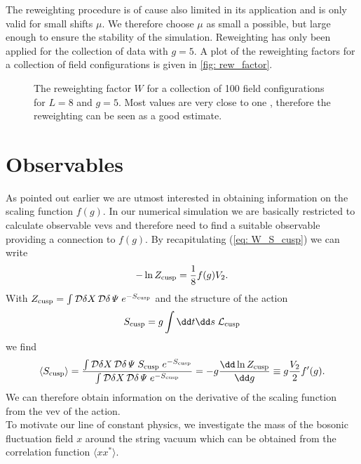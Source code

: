 %
%
The reweighting procedure is of cause also limited in its application and is only valid for small shifts $\mu$. We therefore choose $\mu$ as small a possible, but large enough to ensure the stability of the simulation. Reweighting has only been applied for the collection of data with $g=5$. A plot of the reweighting factors for a collection of field configurations is given in \autoref{fig: rew_factor}.
%
%
\begin{figure}
\centering

\caption{The reweighting factor $W$ for a collection of 100 field configurations for $L=8$ and $g=5$. Most values are very close to one , therefore the reweighting can be seen as a good estimate. \label{fig: rew_factor}}
\end{figure}
%
%
%
%
%
%
%
%
%
%
%
\section{Observables}
As pointed out earlier we are utmost interested in obtaining information on the scaling function $f(g)$. In our numerical simulation we are basically restricted to calculate observable vevs and therefore need to find a suitable observable providing a connection to $f(g)$. By recapitulating (\ref{eq: W_S_cusp}) we can write
%
%
\begin{equation}
-\ln Z_{\rm cusp} = \frac{1}{8} f(g)V_{2}.
\end{equation}
%
%
With $Z_{\rm cusp} = \int \mathcal{D}\delta X\,\mathcal{D}\delta \mathit{\Psi}\;e^{-S_{\rm cusp}}$ and the structure of the action 
\begin{equation}
S_{\rm cusp} = g \int \dd t \dd s \; \mathcal{L}_{\rm cusp}
\end{equation}
we find
%
%
\begin{equation}
\langle S_{\rm cusp} \rangle = \frac{\int \mathcal{D}\delta X\,\mathcal{D}\delta\mathit{\Psi} \; S_{\rm cusp} \;e^{-S_{\rm cusp}}}{\int \mathcal{D}\delta X\,\mathcal{D}\delta\mathit{\Psi} \; e^{-S_{\rm cusp}}} = -g \frac{\dd \ln Z_{\rm cusp}}{\dd g} \equiv g\frac{V_{2}}{2} f'(g).
\label{eq: <S_cusp>}
\end{equation}
%
%
We can therefore obtain information on the derivative of the scaling function from the vev of the action.\\
To motivate our line of constant physics, we investigate the mass of the bosonic fluctuation field $x$ around the string vacuum which can be obtained from the correlation function $\langle x x^{*}\rangle$.
%
%
%
%
%
%
%
% 
